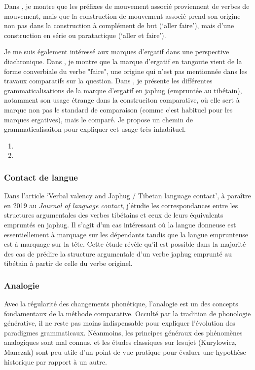 \documentclass[oldfontcommands,oneside,a4paper,11pt]{article}
\begin{document}
Dans \citet{jacques13harmonization}, je montre que les préfixes de mouvement associé proviennent de verbes de mouvement, mais que la construction de mouvement associé prend son origine non pas dans la construction à complément de but (`aller faire'), mais d'une construction en série ou paratactique (`aller et faire').

Je me suis également intéressé aux marques d'ergatif dans une perspective diachronique. Dans \citet{jacques14ergative}, je montre que la marque d'ergatif en tangoute vient de la forme converbiale du verbe "faire", une origine qui n'est pas mentionnée dans les travaux comparatifs sur la question. Dans \citet{jacques16comparative}, je présente les différentes grammaticalisations de la marque d'ergatif en japhug (empruntée au tibétain), notamment son usage étrange dans la construciton comparative, où elle sert à marque non pas le standard de comparaison (comme c'est habituel pour les marques ergatives), mais le comparé. Je propose un chemin de grammaticalisaiton pour expliquer cet usage très inhabituel.

\begin{enumerate}
 \item  {}
 \item {}
\end{enumerate}

\subsubsection{Contact de langue}
Dans l'article `Verbal valency and Japhug / Tibetan language contact', à paraître en 2019 au \textit{Journal of language contact}, j'étudie les correspondances entre les structures argumentales des verbes tibétains et ceux de leurs équivalents empruntés en japhug. Il s'agit d'un cas intéressant où la langue donneuse est essentiellement à marquage sur les dépendants tandis que la langue emprunteuse est à marquage sur la tête. Cette étude révèle qu'il est possible dans la majorité des cas de prédire la structure argumentale d'un verbe japhug emprunté au tibétain à partir de celle du verbe originel.

\subsubsection{Analogie}
Avec la régularité des changements phonétique, l'analogie est un des concepts fondamentaux de la méthode comparative. Occulté par la tradition de phonologie générative, il ne reste pas moins indispensable pour expliquer l'évolution des paradigmes grammaticaux. Néanmoins, les principes généraux des phénomènes analogiques sont mal connus, et les études classiques sur lesujet (Kurylowicz, Manczak) sont peu utile d'un point de vue pratique pour évaluer une hypothèse historique par rapport à un autre. 
\end{document}
